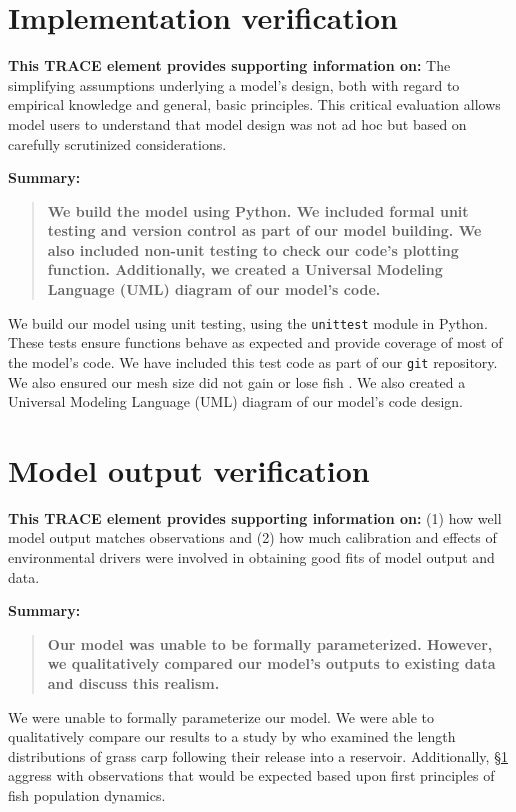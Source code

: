 \documentclass{article}[12pt]
\begin{document}
\section{Implementation verification}\label{sec:IpVer}
\textbf{This TRACE element provides supporting information on:} The simplifying assumptions underlying a model's design, both with regard to empirical knowledge and general, basic principles. This critical evaluation allows model users to understand that model design was not ad hoc but based on carefully scrutinized considerations. 

\textbf{Summary:}
\begin{verse}
\textbf{ 
We build the model using Python.
We included formal unit testing and version control as part of our model building.
We also included non-unit testing to check our code's plotting function.
Additionally, we created a Universal Modeling Language (UML) diagram of our model's code.}
\end{verse}

We build our model using unit testing, using the \texttt{unittest} module in Python.
These tests ensure functions behave as expected and provide coverage of most of the model's code.
We have included this test code as part of our \texttt{git} repository.  
We also ensured our mesh size did not gain or lose fish \citep{williams2012avoiding}.  
We also created a Universal Modeling Language (UML) diagram of our model's code design. 

\section{Model output verification}

\textbf{This TRACE element provides supporting information on:} (1) how well model output matches observations and (2) how much calibration and effects of environmental drivers were involved in obtaining good fits of model output and data. 

\textbf{Summary:}
\begin{verse}
\textbf{
Our model was unable to be formally parameterized. 
However, we qualitatively compared our model's outputs to existing data and discuss this realism. 
}
\end{verse}

We were unable to formally parameterize our model. 
We were able to qualitatively compare our results to a study by \citet{martyn1986mapping} who examined the length distributions of grass carp following their release into a reservoir.
Additionally, \S \ref{sec:IpVer} aggress with observations that would be expected based upon first principles of fish population dynamics. 
\end{document}
